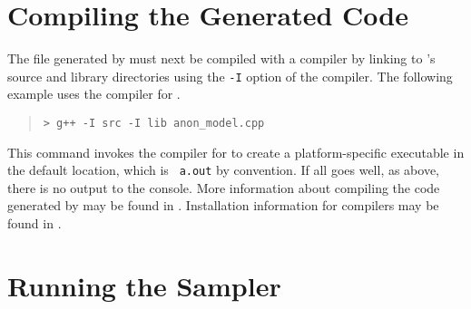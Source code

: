 \section{Compiling the Generated Code}

The file generated by \stanc must next be compiled with a \Cpp
compiler by linking to \Stan's source and library directories using
the {\tt -I} option of the compiler.  The following example 
uses the \clang compiler for \Cpp.
%
\begin{quote}
\begin{Verbatim}[fontshape=sl]
> g++ -I src -I lib anon_model.cpp 
\end{Verbatim}
\end{quote}
%
This command invokes the \clang compiler for \Cpp to create a
platform-specific executable in the default location, which is {\tt
  a.out} by convention.  If all goes well, as above, there is no
output to the console.  More information about compiling the \Cpp code
generated by \Stan may be found in .
Installation information for \Cpp compilers may be found in
.

\section{Running the Sampler}

